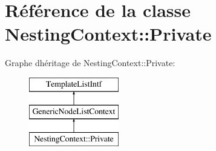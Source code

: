 \hypertarget{class_nesting_context_1_1_private}{}\section{Référence de la classe Nesting\+Context\+:\+:Private}
\label{class_nesting_context_1_1_private}
Graphe d\textquotesingle{}héritage de Nesting\+Context\+:\+:Private\+:\begin{figure}[H]
\begin{center}
\leavevmode
\includegraphics[height=3.000000cm]{class_nesting_context_1_1_private}
\end{center}
\end{figure}
